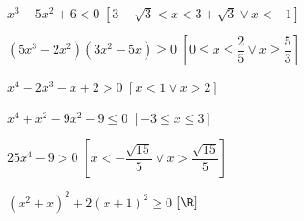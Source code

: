 \begin{esercizio}[\Ast]
\begin{enumeratea}
\item \(x^3-5x^2+6<0\) \hfill \(\left[3-\sqrt 3<x<3+\sqrt 3\vee x<-1\right]\)
\item \(\left(5x^3-2x^2\right)\left(3x^2-5x\right)\ge 0\) 
 \hfill \(\left[0\le x\le \dfrac 2 5\vee x\ge \dfrac 5 3\right]\)
\item \(x^4-2x^3-x+2>0\) \hfill \(\left[x<1\vee x>2\right]\)
\item \(x^4+x^2-9x^2-9\le 0\) \hfill \(\left[-3\le x\le 3\right]\)
\item \(25x^4-9>0\) 
 \hfill \(\left[x<-\dfrac{\sqrt{15}} 5\vee x>\dfrac{\sqrt{15}} 5\right]\)
\item \(\left(x^2+x\right)^2+2\left(x+1\right)^2\ge 0\) 
 \hfill \(\left[\R\right]\)
\end{enumeratea}
\end{esercizio}
% 
% 
